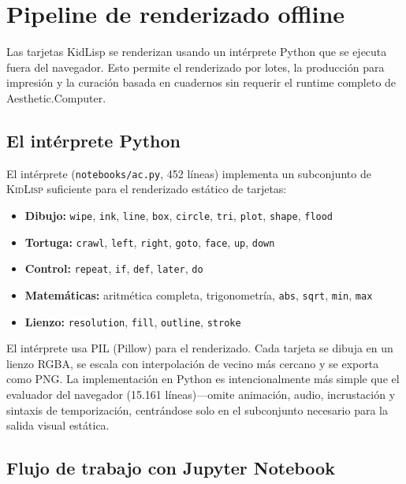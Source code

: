 \documentclass[10pt,letterpaper,twocolumn]{article}
\newcommand{\acdot}{{\color{acpink}.}}
\newcommand{\kidlisp}{\textsc{KidLisp}}
\begin{document}

\section{Pipeline de renderizado offline}
\label{sec:pipeline}

Las tarjetas KidLisp se renderizan usando un int\'erprete Python que se ejecuta fuera del navegador. Esto permite el renderizado por lotes, la producci\'on para impresi\'on y la curaci\'on basada en cuadernos sin requerir el runtime completo de Aesthetic\acdot Computer.

\subsection{El int\'erprete Python}

El int\'erprete (\texttt{notebooks/ac.py}, 452 l\'ineas) implementa un subconjunto de \kidlisp{} suficiente para el renderizado est\'atico de tarjetas:

\begin{itemize}
  \item \textbf{Dibujo:} \texttt{wipe}, \texttt{ink}, \texttt{line}, \texttt{box}, \texttt{circle}, \texttt{tri}, \texttt{plot}, \texttt{shape}, \texttt{flood}
  \item \textbf{Tortuga:} \texttt{crawl}, \texttt{left}, \texttt{right}, \texttt{goto}, \texttt{face}, \texttt{up}, \texttt{down}
  \item \textbf{Control:} \texttt{repeat}, \texttt{if}, \texttt{def}, \texttt{later}, \texttt{do}
  \item \textbf{Matem\'aticas:} aritm\'etica completa, trigonometr\'ia, \texttt{abs}, \texttt{sqrt}, \texttt{min}, \texttt{max}
  \item \textbf{Lienzo:} \texttt{resolution}, \texttt{fill}, \texttt{outline}, \texttt{stroke}
\end{itemize}

El int\'erprete usa PIL (Pillow) para el renderizado. Cada tarjeta se dibuja en un lienzo RGBA, se escala con interpolaci\'on de vecino m\'as cercano y se exporta como PNG. La implementaci\'on en Python es intencionalmente m\'as simple que el evaluador del navegador (15.161 l\'ineas)---omite animaci\'on, audio, incrustaci\'on y sintaxis de temporizaci\'on, centr\'andose solo en el subconjunto necesario para la salida visual est\'atica.

\subsection{Flujo de trabajo con Jupyter Notebook}
\end{document}
